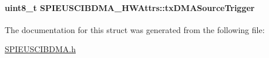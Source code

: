 \paragraph[{tx\+D\+M\+A\+Source\+Trigger}]{\setlength{\rightskip}{0pt plus 5cm}uint8\+\_\+t S\+P\+I\+E\+U\+S\+C\+I\+B\+D\+M\+A\+\_\+\+H\+W\+Attrs\+::tx\+D\+M\+A\+Source\+Trigger}\label{struct_s_p_i_e_u_s_c_i_b_d_m_a___h_w_attrs_a683a8356a28b557d278d969bab6f1ef8}


The documentation for this struct was generated from the following file\+:\begin{DoxyCompactItemize}
\item 
\hyperlink{_s_p_i_e_u_s_c_i_b_d_m_a_8h}{S\+P\+I\+E\+U\+S\+C\+I\+B\+D\+M\+A.\+h}\end{DoxyCompactItemize}
